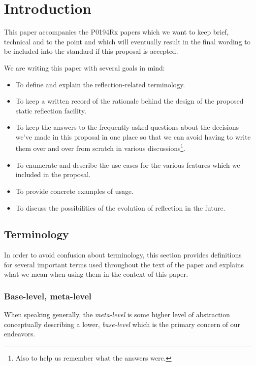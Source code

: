 \section{Introduction}

This paper accompanies the P0194Rx papers which we want to keep brief, technical
and to the point and which will eventually result in the final wording to be
included into the standard if this proposal is accepted.

We are writing this paper with several goals in mind:

\begin{itemize}
\item To define and explain the reflection-related terminology.
\item To keep a written record of the rationale behind the design of the
proposed static reflection facility.
\item To keep the answers to the frequently asked questions about
the decisions we've made in this proposal in one place so that we can avoid
having to write them over and over from scratch in various discussions\footnote{
Also to help us remember what the answers were.}.
\item To enumerate and describe the use cases for the various features
which we included in the proposal.
\item To provide concrete examples of usage.
\item To discuss the possibilities of the evolution of reflection in the future.
\end{itemize}

\subsection{Terminology}

In order to avoid confusion about terminology, this section provides definitions
for several important terms used throughout the text of the paper and
explains what we mean when using them in the context of this paper.

\subsubsection{Base-level, meta-level}
\label{term-base-meta-level}

When speaking generally, the {\em meta-level} is some higher level of abstraction
conceptually describing a lower, {\em base-level} which is the primary concern
of our endeavors.

